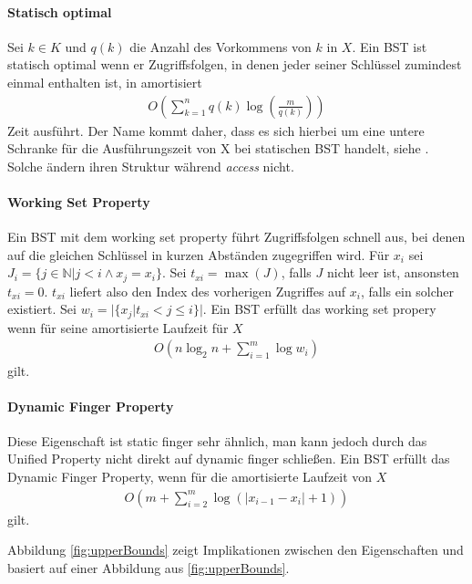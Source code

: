 \documentclass[a4paper,12pt]{article}
\begin{document}
\paragraph{Statisch optimal}
Sei $k \in K$ und $q(k)$ die Anzahl des Vorkommens von $k$ in  $X$. Ein BST ist statisch optimal wenn er Zugriffsfolgen, in denen jeder seiner Schlüssel zumindest einmal enthalten ist, in amortisiert 
\begin{align*}
O\left(\sum_{k = 1}^{n}q(k)\log \left( \frac{m}{q(k)} \right)\right) 
\end{align*}
Zeit ausführt. Der Name kommt daher, dass es sich hierbei um eine untere Schranke für die Ausführungszeit von X bei statischen BST handelt, siehe \cite{staticOptimal}. Solche ändern ihren Struktur während \textit{access} nicht.

\paragraph{Working Set Property}
Ein BST mit dem working set property führt Zugriffsfolgen schnell aus, bei denen auf die gleichen Schlüssel in kurzen Abständen zugegriffen wird.
Für $x_i$ sei $J_i = \{j \in \mathbb{N} \vert j < i \land x_j = x_i \}$.
Sei $t_{xi} = \max \left(J\right)$, falls $J$ nicht leer ist, ansonsten $t_{xi} = 0$. $t_{xi}$ liefert also den Index des vorherigen Zugriffes auf $x_i$, falls ein solcher existiert. Sei ${w_i = \vert\{x_j \vert t_{xi} < j \leq i   \} \vert }$.
Ein BST erfüllt das working set propery wenn für seine amortisierte Laufzeit für $X$
\begin{align*}
O\left(n \log_2 n + \sum_{i = 1}^{m} \log w_i \right)
\end{align*} 
gilt. 


\paragraph{Dynamic Finger Property}
Diese Eigenschaft ist static finger sehr ähnlich, man kann jedoch durch das Unified Property nicht direkt auf dynamic finger schließen. 
Ein BST erfüllt das Dynamic Finger Property, wenn für die amortisierte Laufzeit von $X$
\begin{align*}
O\left( m + \sum_{i = 2}^{m} \log \left(\vert x_{i-1} - x_i  \vert	+ 1	\right)\right)
\end{align*} 
gilt. 

\noindent Abbildung \ref{fig:upperBounds} zeigt Implikationen zwischen den Eigenschaften und basiert auf einer Abbildung aus \ref{fig:upperBounds}.
\end{document}
